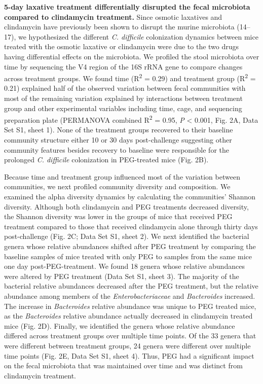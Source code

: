 \documentclass[
  11pt,
]{article}
\begin{document}
\textbf{5-day laxative treatment differentially disrupted the fecal
microbiota compared to clindamycin treatment.} Since osmotic laxatives
and clindamycin have previously been shown to disrupt the murine
microbiota (14--17), we hypothesized the different \emph{C. difficile}
colonization dynamics between mice treated with the osmotic laxative or
clindamycin were due to the two drugs having differential effects on the
microbiota. We profiled the stool microbiota over time by sequencing the
V4 region of the 16S rRNA gene to compare changes across treatment
groups. We found time (R\textsuperscript{2} = 0.29) and treatment group
(R\textsuperscript{2} = 0.21) explained half of the observed variation
between fecal communities with most of the remaining variation explained
by interactions between treatment group and other experimental variables
including time, cage, and sequencing preparation plate (PERMANOVA
combined R\textsuperscript{2} = 0.95, \emph{P} \textless{} 0.001, Fig.
2A, Data Set S1, sheet 1). None of the treatment groups recovered to
their baseline community structure either 10 or 30 days post-challenge
suggesting other community features besides recovery to baseline were
responsible for the prolonged \emph{C. difficile} colonization in
PEG-treated mice (Fig. 2B).

Because time and treatment group influenced most of the variation
between communities, we next profiled community diversity and
composition. We examined the alpha diversity dynamics by calculating the
communities' Shannon diversity. Although both clindamycin and PEG
treatments decreased diversity, the Shannon diversity was lower in the
groups of mice that received PEG treatment compared to those that
received clindamycin alone through thirty days post-challenge (Fig. 2C;
Data Set S1, sheet 2). We next identified the bacterial genera whose
relative abundances shifted after PEG treatment by comparing the
baseline samples of mice treated with only PEG to samples from the same
mice one day post-PEG-treatment. We found 18 genera whose relative
abundances were altered by PEG treatment (Data Set S1, sheet 3). The
majority of the bacterial relative abundances decreased after the PEG
treatment, but the relative abundance among members of the
\emph{Enterobacteriaceae} and \emph{Bacteroides} increased. The increase
in \emph{Bacteroides} relative abundance was unique to PEG treated mice,
as the \emph{Bacteroides} relative abundance actually decreased in
clindamycin treated mice (Fig. 2D). Finally, we identified the genera
whose relative abundance differed across treatment groups over multiple
time points. Of the 33 genera that were different between treatment
groups, 24 genera were different over multiple time points (Fig. 2E,
Data Set S1, sheet 4). Thus, PEG had a significant impact on the fecal
microbiota that was maintained over time and was distinct from
clindamycin treatment.
\end{document}
